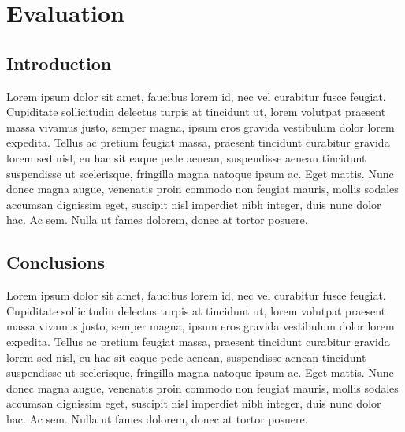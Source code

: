 \chapter{Evaluation}
\section{Introduction}
 Lorem ipsum dolor sit amet, faucibus lorem id, nec vel curabitur fusce feugiat. Cupiditate sollicitudin delectus turpis at tincidunt ut, lorem volutpat praesent massa vivamus justo, semper magna, ipsum eros gravida vestibulum dolor lorem expedita. Tellus ac pretium feugiat massa, praesent tincidunt curabitur gravida lorem sed nisl, eu hac sit eaque pede aenean, suspendisse aenean tincidunt suspendisse ut scelerisque, fringilla magna natoque ipsum ac. Eget mattis. Nunc donec magna augue, venenatis proin commodo non feugiat mauris, mollis sodales accumsan dignissim eget, suscipit nisl imperdiet nibh integer, duis nunc dolor hac. Ac sem. Nulla ut fames dolorem, donec at tortor posuere.
  
  \section{Conclusions}
Lorem ipsum dolor sit amet, faucibus lorem id, nec vel curabitur fusce feugiat. Cupiditate sollicitudin delectus turpis at tincidunt ut, lorem volutpat praesent massa vivamus justo, semper magna, ipsum eros gravida vestibulum dolor lorem expedita. Tellus ac pretium feugiat massa, praesent tincidunt curabitur gravida lorem sed nisl, eu hac sit eaque pede aenean, suspendisse aenean tincidunt suspendisse ut scelerisque, fringilla magna natoque ipsum ac. Eget mattis. Nunc donec magna augue, venenatis proin commodo non feugiat mauris, mollis sodales accumsan dignissim eget, suscipit nisl imperdiet nibh integer, duis nunc dolor hac. Ac sem. Nulla ut fames dolorem, donec at tortor posuere.